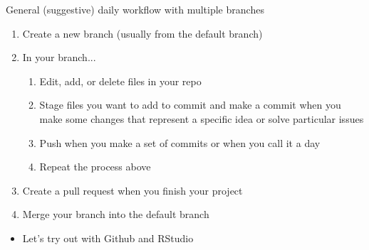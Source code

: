 \documentclass[handout,pdftex,10pt,aspectratio=169]{beamer}
\begin{document}
\begin{frame}{General (suggestive) daily workflow with multiple branches}
  \begin{enumerate}[<+->]
    \item Create a new branch (usually from the default branch)
    \item In your branch...
    \begin{enumerate}
      \item Edit, add, or delete files in your repo
      \item Stage files you want to add to commit and 
      make a commit when you make some changes that represent a specific idea or solve particular issues
      \item Push when you make a set of commits or when you call it a day  
      \item Repeat the process above
    \end{enumerate}
    \item Create a pull request when you finish your project
    \item Merge your branch into the default branch
  \end{enumerate}
  \begin{itemize}
    \item<10-> Let's try out with Github and RStudio
  \end{itemize}
\end{frame}
\end{document}
